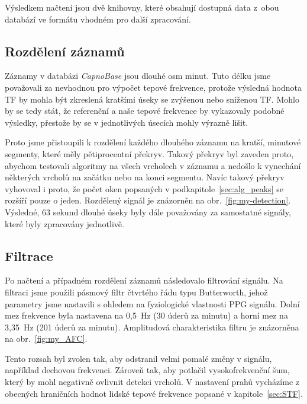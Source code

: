 Výsledkem načtení jsou dvě knihovny, které obsahují dostupná data z~obou databází ve formátu vhodném pro další zpracování.

\subsection*{Rozdělení záznamů}
\label{sec:alg_split}
Záznamy v databázi \emph{CapnoBase} jsou dlouhé osm minut.
Tuto délku jsme považovali za nevhodnou pro výpočet tepové frekvence, protože výsledná hodnota TF by mohla být zkreslená kratšími úseky se zvýšenou nebo sníženou TF.
Mohlo by se tedy stát, že referenční a naše tepové frekvence by vykazovaly podobné výsledky, přestože by se v jednotlivých úsecích mohly výrazně lišit.

Proto jsme přistoupili k rozdělení každého dlouhého záznamu na kratší, minutové segmenty, které měly pětiprocentní překryv.
Takový překryv byl zaveden proto, abychom testovali algoritmy na všech vrcholech v záznamu a nedošlo k vynechání některých vrcholů na začátku nebo na konci segmentu.
Navíc takový překryv vyhovoval i proto, že počet oken popsaných v podkapitole~\ref{sec:alg_peaks} se rozšíří pouze o jeden.
Rozdělený signál je znázorněn na obr.~\ref{fig:my-detection}.
Výsledné, 63 sekund dlouhé úseky byly dále považovány za samostatné signály, které byly zpracovány jednotlivě.

\subsection*{Filtrace}
\label{sec:alg_filter}
Po načtení a případném rozdělení záznamů následovalo filtrování signálu.
Na filtraci jsme použili pásmový filtr čtvrtého řádu typu Butterworth, jehož parametry jsme nastavili s ohledem na fyziologické vlastnosti PPG signálu.
Dolní mez frekvence byla nastavena na 0,5~Hz (30 úderů za minutu) a horní mez na 3,35~Hz (201 úderů za minutu).
Amplitudová charakteristika filtru je znázorněna na obr.~\ref{fig:my_AFC}.

Tento rozsah byl zvolen tak, aby odstranil velmi pomalé změny v signálu, například dechovou frekvenci. Zároveň tak, aby potlačil vysokofrekvenční šum, který by mohl negativně ovlivnit detekci vrcholů.
V nastavení prahů vycházíme z obecných hraničních hodnot lidské tepové frekvence popsané v kapitole~\ref{sec:STF}.


